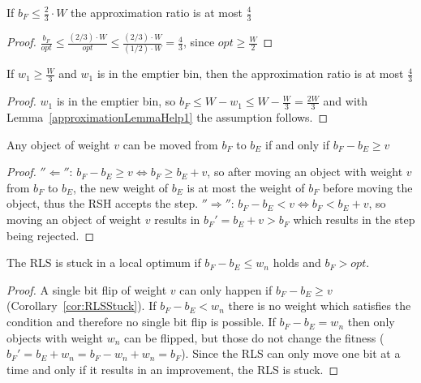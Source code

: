 \begin{lemma}\label{approximationLemmaHelp1}
    If \(b_F \le \frac{2}{3} \cdot W\) the approximation ratio is at most $\frac{4}{3}$
\end{lemma}
\begin{proof}
    \(\frac{b_F}{opt} \le \frac{(2/3) \cdot W}{opt} \le \frac{(2/3) \cdot W}{(1/2) \cdot W} = \frac{4}{3}\), since \(opt \ge \frac{W}{2}\)
\end{proof}

\begin{corollary}\label{approximationCorollaryHelp2}
    If \(w_1 \ge \frac{W}{3}\) and \(w_1\) is in the emptier bin, then the approximation ratio is at most $\frac{4}{3}$
\end{corollary}
\begin{proof}
    $w_1$ is in the emptier bin, so \( b_F \le W - w_1 \le W - \frac{W}{3} = \frac{2W}{3} \) and with Lemma~\ref{approximationLemmaHelp1} the assumption follows.
\end{proof}

\begin{lemma}\label{movingObjectsLemma}
    Any object of weight $v$ can be moved from $b_F$ to $b_E$ if and only if \(b_F - b_E \ge v\)
\end{lemma}
\begin{proof}
    $''\Leftarrow''$:\newline
    \(b_F - b_E \ge v \Leftrightarrow b_F \ge b_E + v\), so after moving an object with weight $v$ from $b_F$ to $b_E$, the new weight of $b_E$ is at most the weight of $b_F$ before moving the object, thus the RSH accepts the step.\newline
    $''\Rightarrow''$:\newline
    \(b_F - b_E < v \Leftrightarrow b_F < b_E + v\), so moving an object of weight $v$ results in ${b_F}' = b_E+v > b_F$ which results in the step being rejected.
\end{proof}

\begin{corollary}\label{cor:RLSStuck}
    The RLS is stuck in a local optimum if \(b_F-b_E \le w_n\) holds and \(b_F > opt\).
\end{corollary}
\begin{proof}
    A single bit flip of weight $v$ can only happen if \(b_F - b_E \ge v\) (Corollary~\ref{cor:RLSStuck}). If \(b_F-b_E < w_n\) there is no weight which satisfies the condition and therefore no single bit flip is possible.
    If \(b_F-b_E = w_n\) then only objects with weight \(w_n\) can be flipped, but those do not change the fitness ($b_F' = b_E + w_n = b_F - w_n +w_n = b_F$).
    Since the RLS can only move one bit at a time and only if it results in an improvement, the RLS is stuck.
\end{proof}

